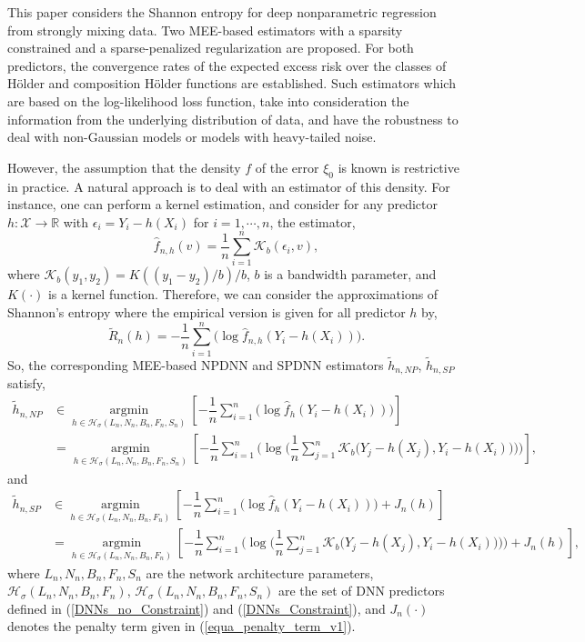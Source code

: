 \documentclass[10pt,twoside]{article}
\numberwithin{equation}{section}
\newcommand{\R}{\ensuremath{\mathbb{R}}}
\DeclareMathOperator*{\argmin}{argmin}
\newcommand{\mx}{ { \mathcal{X}} }
\begin{document}
 This paper considers the Shannon entropy for deep nonparametric regression from strongly mixing data.
 Two MEE-based estimators with a sparsity constrained and a sparse-penalized regularization are proposed.
For both predictors, the convergence rates of the expected excess risk over the classes of H\"older and composition H\"older functions are established.
Such estimators which are based on the log-likelihood loss function, take into consideration the information from the underlying distribution of data, and have the robustness to deal with non-Gaussian models or models with heavy-tailed noise.

\medskip

\noindent
However, the assumption that the density $f$ of the error $\xi_0$ is known is restrictive in practice. 
A natural approach is to deal with an estimator of this density.
For instance, one can perform a kernel estimation, and consider for any predictor $h : \mx \rightarrow \R$ with $\epsilon_i = Y_i - h(X_i)$ for $i=1,\cdots,n$, the estimator,
%
\begin{equation}\label{equa_kernel_estimator}
\widehat{f}_{n,h}(v) = \dfrac{1}{n} \sum_{i=1}^n \mathcal{K}_b(\epsilon_i, v),
\end{equation}
%
where $\mathcal{K}_b(y_1, y_2) = K((y_1 - y_2)/b)/b$, $b$ is a bandwidth parameter, and $K(\cdot)$ is a kernel function.
%
Therefore, we can consider the approximations of Shannon's entropy where the empirical version is given for all predictor $h$ by,
%
\[ \widetilde{R}_n(h) = - \dfrac{1}{n} \sum_{i=1}^{n} \Big(\log \widehat{f}_{n,h}(Y_i - h(X_i)) \Big) .\]
%
So, the corresponding MEE-based NPDNN and SPDNN estimators $\widetilde{h}_{n,NP}$, $\widetilde{h}_{n,SP}$ satisfy,
%
\begin{align}\label{sparse_DNNs_Estimators_v2_NP}
\nonumber \widetilde{h}_{n,NP} & \in \underset{h \in  \mathcal{H}_{\sigma}(L_n, N_n, B_n, F_n, S_n)}{\argmin} \left[ -\dfrac{1}{n} \sum_{i=1}^{n} \Big(\log \widehat{f}_{h}(Y_i - h(X_i)) \Big) \right] \\
& = \underset{h \in  \mathcal{H}_{\sigma}(L_n, N_n, B_n, F_n, S_n)}{\argmin} \left[ -\dfrac{1}{n} \sum_{i=1}^{n} \Bigg(\log \Big( \dfrac{1}{n}\sum_{j=1}^n \mathcal{K}_b \big(Y_j - h(X_j), Y_i - h(X_i) \big) \Big) \Bigg) \right],
\end{align}
%
and 
%
\begin{align}\label{sparse_DNNs_Estimators_v2_SP}
\nonumber \widetilde{h}_{n,SP} & \in \underset{h \in  \mathcal{H}_{\sigma}(L_n, N_n, B_n, F_n)}{\argmin} \left[ -\dfrac{1}{n} \sum_{i=1}^{n} \Big(\log \widehat{f}_{h}(Y_i - h(X_i)) \Big) + J_n(h) \right] \\
& = \underset{h \in  \mathcal{H}_{\sigma}(L_n, N_n, B_n, F_n)}{\argmin} \left[ -\dfrac{1}{n} \sum_{i=1}^{n} \Bigg(\log \Big( \dfrac{1}{n}\sum_{j=1}^n \mathcal{K}_b \big(Y_j - h(X_j), Y_i - h(X_i) \big) \Big) \Bigg) + J_n(h) \right],
\end{align}
%
where $L_n, N_n, B_n, F_n, S_n$ are the network architecture parameters, $\mathcal{H}_{\sigma}(L_n, N_n, B_n, F_n)$, $\mathcal{H}_{\sigma}(L_n, N_n, B_n, F_n, S_n)$ are the set of DNN predictors defined in (\ref{DNNs_no_Constraint}) and (\ref{DNNs_Constraint}), and $J_n(\cdot)$ denotes the penalty term given in (\ref{equa_penalty_term_v1}).   
 
\end{document}

